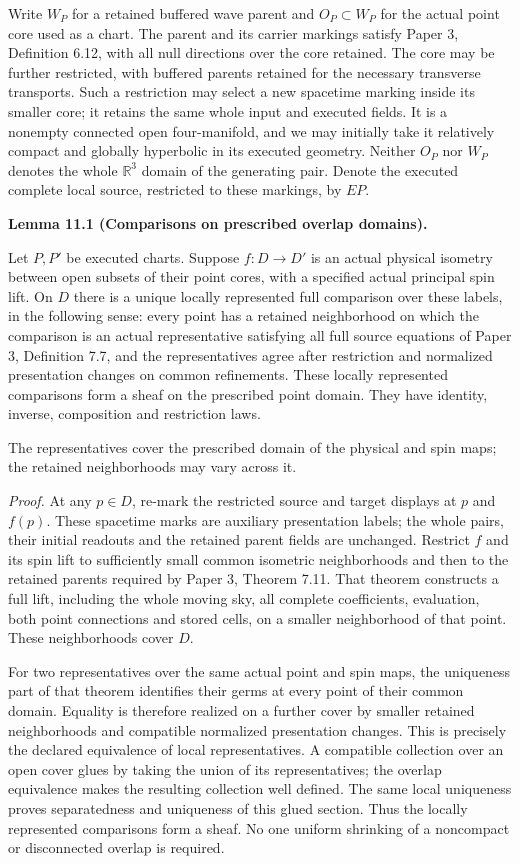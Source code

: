 \documentclass[
  english,
  11pt,
  reqno]{amsart}
\makeatletter
\newcounter{none} %
\newcommand{\pandocstatementheading}[1]{%
  \par\addpenalty{\@beginparpenalty}%
  \addvspace{.5\baselineskip plus .2\baselineskip minus .2\baselineskip}%
  {\normalfont\bfseries #1\par}%
  \nobreak\@afterindenttrue\@afterheading
}
\makeatother
\begin{document}
Write \(W_P\) for a retained buffered wave parent and \(O_P\subset W_P\)
for the actual point core used as a chart. The parent and its carrier
markings satisfy Paper 3, Definition 6.12, with all null directions over
the core retained. The core may be further restricted, with buffered
parents retained for the necessary transverse transports. Such a
restriction may select a new spacetime marking inside its smaller core;
it retains the same whole input and executed fields. It is a nonempty
connected open four-manifold, and we may initially take it relatively
compact and globally hyperbolic in its executed geometry. Neither
\(O_P\) nor \(W_P\) denotes the whole \(\mathbb R^3\) domain of the
generating pair. Denote the executed complete local source, restricted
to these markings, by \(E P\).

\pandocstatementheading{\protect{}\label{lem:ordinary-atlas-local-comparison-sheaf}Lemma 11.1 (Comparisons on prescribed overlap domains).}

Let \(P,P'\) be executed charts. Suppose \(f:D\to D'\) is an actual
physical isometry between open subsets of their point cores, with a
specified actual principal spin lift. On \(D\) there is a unique locally
represented full comparison over these labels, in the following sense:
every point has a retained neighborhood on which the comparison is an
actual representative satisfying all full source equations of Paper 3,
Definition 7.7, and the representatives agree after restriction and
normalized presentation changes on common refinements. These locally
represented comparisons form a sheaf on the prescribed point domain.
They have identity, inverse, composition and restriction laws.

The representatives cover the prescribed domain of the physical and spin
maps; the retained neighborhoods may vary across it.

\emph{Proof.} At any \(p\in D\), re-mark the restricted source and
target displays at \(p\) and \(f(p)\). These spacetime marks are
auxiliary presentation labels; the whole pairs, their initial readouts
and the retained parent fields are unchanged. Restrict \(f\) and its
spin lift to sufficiently small common isometric neighborhoods and then
to the retained parents required by Paper 3, Theorem 7.11. That theorem
constructs a full lift, including the whole moving sky, all complete
coefficients, evaluation, both point connections and stored cells, on a
smaller neighborhood of that point. These neighborhoods cover \(D\).

For two representatives over the same actual point and spin maps, the
uniqueness part of that theorem identifies their germs at every point of
their common domain. Equality is therefore realized on a further cover
by smaller retained neighborhoods and compatible normalized presentation
changes. This is precisely the declared equivalence of local
representatives. A compatible collection over an open cover glues by
taking the union of its representatives; the overlap equivalence makes
the resulting collection well defined. The same local uniqueness proves
separatedness and uniqueness of this glued section. Thus the locally
represented comparisons form a sheaf. No one uniform shrinking of a
noncompact or disconnected overlap is required.
\end{document}
